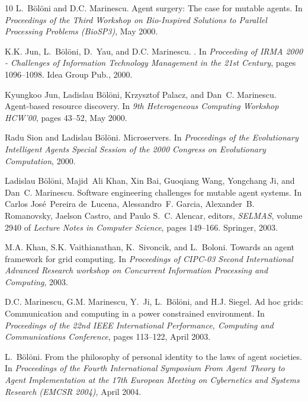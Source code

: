 \begin{thebibliography}{10}
L.~B{\"o}l{\"o}ni and D.C. Marinescu.
\newblock Agent surgery: The case for mutable agents.
\newblock In {\em Proceedings of the Third Workshop on Bio-Inspired Solutions
  to Parallel Processing Problems (BioSP3)}, May 2000.

K.K. Jun, L.~B{\"o}l{\"o}ni, D.~Yau, and D.C. Marinescu.
.
\newblock In {\em Proceeding of IRMA 2000 - Challenges of Information
  Technology Management in the 21st Century}, pages 1096--1098. Idea Group
  Pub., 2000.

Kyungkoo Jun, Ladislau B{\"o}l{\"o}ni, Krzysztof Palacz, and Dan~C. Marinescu.
\newblock Agent-based resource discovery.
\newblock In {\em 9th Heterogeneous Computing Workshop HCW'00}, pages 43--52,
  May 2000.

Radu Sion and Ladislau B{\"o}l{\"o}ni.
\newblock Microservers.
\newblock In {\em Proceedings of the Evolutionary Intelligent Agents Special
  Session of the 2000 Congress on Evolutionary Computation}, 2000.

Ladislau B{\"o}l{\"o}ni, Majid~Ali Khan, Xin Bai, Guoqiang Wang, Yongchang Ji,
  and Dan~C. Marinescu.
\newblock Software engineering challenges for mutable agent systems.
\newblock In Carlos Jos{\'e}~Pereira de~Lucena, Alessandro~F. Garcia,
  Alexander~B. Romanovsky, Jaelson Castro, and Paulo S.~C. Alencar, editors,
  {\em SELMAS}, volume 2940 of {\em Lecture Notes in Computer Science}, pages
  149--166. Springer, 2003.

M.A. Khan, S.K. Vaithianathan, K.~Sivoncik, and L.~Boloni.
\newblock Towards an agent framework for grid computing.
\newblock In {\em Proceedings of CIPC-03 Second International Advanced Research
  workshop on Concurrent Information Processing and Computing}, 2003.

D.C. Marinescu, G.M. Marinescu, Y.~Ji, L.~B{\"o}l{\"o}ni, and H.J. Siegel.
\newblock Ad hoc grids: Communication and computing in a power constrained
  environment.
\newblock In {\em Proceedings of the 22nd IEEE International Performance,
  Computing and Communications Conference}, pages 113--122, April 2003.

L.~B{\"o}l{\"o}ni.
\newblock From the philosophy of personal identity to the laws of agent
  societies.
\newblock In {\em Proceedings of the Fourth International Symposium From Agent
  Theory to Agent Implementation at the 17th European Meeting on Cybernetics
  and Systems Research (EMCSR 2004)}, April 2004.


\end{thebibliography}
